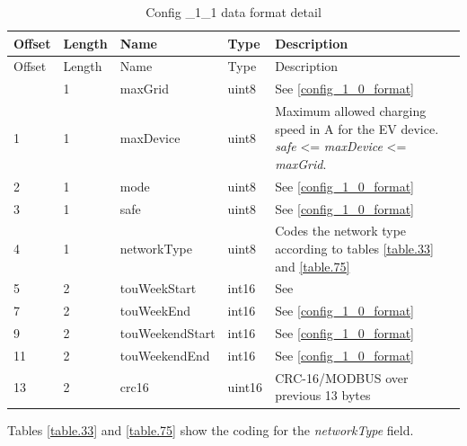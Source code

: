 \documentclass[a4paper]{article}
\newcommand{\secref}[1]{\ref{#1} \nameref{#1}}
\begin{document}
\begin{longtable}[]{@{}llllp{9cm}@{}}
	\caption{Config \_1\_1 data format detail}
	\label{table.78}
	\tabularnewline
	\toprule\noalign{}
	Offset & Length & Name            & Type   & Description                                 \\
	\midrule\noalign{}
	\endfirsthead
	\toprule\noalign{}
	Offset & Length & Name            & Type   & Description                                 \\
	\midrule\noalign{}
	\endhead
	\bottomrule\noalign{}
	\endlastfoot
	0      & 1      & maxGrid         & uint8  & See \secref{config_1_0_format}              \\
	1      & 1      & maxDevice       & uint8  & Maximum allowed charging speed in A for the 
	EV device. \emph{safe} \textless= \emph{maxDevice} \textless=
	\emph{maxGrid}. \\
	2      & 1      & mode            & uint8  & See \secref{config_1_0_format}              \\
	3      & 1      & safe            & uint8  & See \secref{config_1_0_format}              \\
	4      & 1      & networkType     & uint8  & Codes the network type according to tables  
	\secref{table.33}  and \secref{table.75}\\
	5      & 2      & touWeekStart    & int16  & See                                         \\
	7      & 2      & touWeekEnd      & int16  & See                                         
	\secref{config_1_0_format} \\
	9      & 2      & touWeekendStart & int16  & See                                         
	\secref{config_1_0_format} \\
	11     & 2      & touWeekendEnd   & int16  & See                                         
	\secref{config_1_0_format} \\
	13     & 2      & crc16           & uint16 & CRC-16/MODBUS over previous 13 bytes        \\
\end{longtable}

Tables \ref{table.33} and \ref{table.75} show the coding for the \emph{networkType} field.
\end{document}
